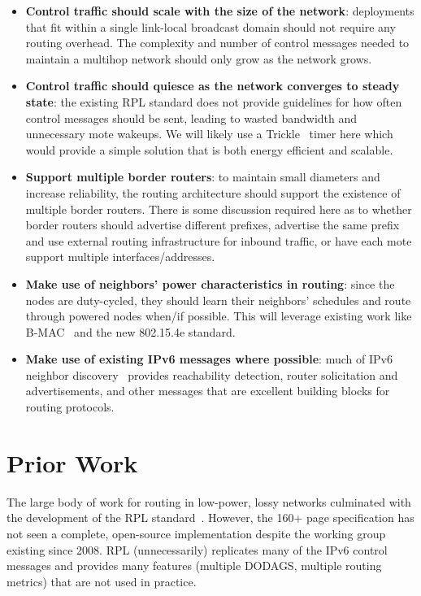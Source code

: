 \documentclass[10pt]{article}
\begin{document}
\begin{itemize}
    \item \textbf{Control traffic should scale with the size of the network}: deployments that fit within a single link-local broadcast domain should not require any routing overhead. The complexity and number of control messages needed to maintain a multihop network should only grow as the network grows.
    \item \textbf{Control traffic should quiesce as the network converges to steady state}: the existing RPL standard does not provide guidelines for how often control messages should be sent, leading to wasted bandwidth and unnecessary mote wakeups. We will likely use a Trickle~\cite{levis2011trickle} timer here which would provide a simple solution that is both energy efficient and scalable.
    \item \textbf{Support multiple border routers}: to maintain small diameters and increase reliability, the routing architecture should support the existence of multiple border routers. There is some discussion required here as to whether border routers should advertise different prefixes, advertise the same prefix and use external routing infrastructure for inbound traffic, or have each mote support multiple interfaces/addresses.
    \item \textbf{Make use of neighbors' power characteristics in routing}: since the nodes are duty-cycled, they should learn their neighbors' schedules and route through powered nodes when/if possible. This will leverage existing work like B-MAC~\cite{polastre2004versatile} and the new 802.15.4e standard.
    \item \textbf{Make use of existing IPv6 messages where possible}: much of IPv6 neighbor discovery~\cite{shelby2012neighbor, narten2007neighbor} provides reachability detection, router solicitation and advertisements, and other messages that are excellent building blocks for routing protocols.
\end{itemize}

\section{Prior Work}

The large body of work for routing in low-power, lossy networks culminated with
the development of the RPL standard~\cite{winter2012rpl}. However, the 160+
page specification has not seen a complete, open-source implementation despite
the working group existing since 2008. RPL (unnecessarily) replicates many of
the IPv6 control messages and provides many features (multiple DODAGS, multiple
routing metrics) that are not used in practice.
\end{document}

